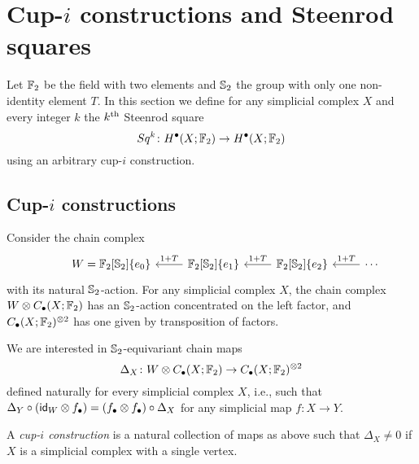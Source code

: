 
\section{Cup-\texorpdfstring{$i$}{i} constructions and Steenrod squares} \label{s:squares}

Let ${\mathbb{F}_2}$ be the field with two elements and $\mathbb{S}_2$ the group with only one non-identity element $T$.
In this section we define for any simplicial complex $X$ and every integer $k$ the $k^{\mathrm{th}}$ Steenrod square
\begin{equation*}
Sq^k \colon H^\bullet(X; {\mathbb{F}_2}) \to H^{\bullet}(X; {\mathbb{F}_2})
\end{equation*}
using an arbitrary cup-$i$ construction.

\subsection{Cup-$i$ constructions}

Consider the chain complex
\begin{equation*}
\begin{tikzcd}[column sep=normal]
& W =  \Ftwo[\Sym_2]\{e_0\} & \arrow[l, "1+T"'] \Ftwo[\Sym_2]\{e_1\} & \arrow[l, "1+T"']
\Ftwo[\Sym_2]\{e_2\} & \arrow[l, "1+T"'] \cdots
\end{tikzcd}
\end{equation*}
with its natural $\mathbb{S}_2$-action.
For any simplicial complex $X$, the chain complex $W \otimes C_\bullet(X; {\mathbb{F}_2})$ has an $\mathbb{S}_2$-action concentrated on the left factor, and $C_\bullet(X; {\mathbb{F}_2})^{\otimes 2}$ has one given by transposition of factors.

We are interested in $\mathbb{S}_2$-equivariant chain maps
\begin{equation} \label{e:steenrod diagonal}
\Delta_X \colon W \otimes C_\bullet(X; {\mathbb{F}_2}) \to C_\bullet(X; {\mathbb{F}_2})^{\otimes 2}
\end{equation}
defined naturally for every simplicial complex $X$, i.e., such that $\Delta_Y \circ (\mathsf{id}_W \otimes f_\bullet) = (f_\bullet \otimes f_\bullet) \circ \Delta_X$ for any simplicial map $f \colon X \to Y$.

\begin{definition}
	A \textit{cup-$i$ construction} is a natural collection of maps as above such that $\Delta_X \neq 0$ if $X$ is a simplicial complex with a single vertex.
\end{definition}

